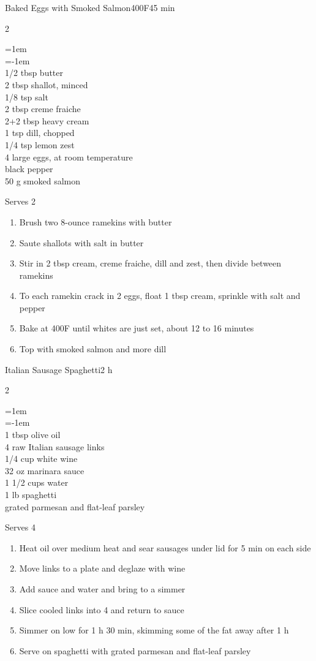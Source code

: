 \documentclass{article}
\newenvironment{recipe}[3][]
    {\begin{cardbase}[#1]{#2}{#3}
    \columnratio{0.333}
    \begin{paracol}{2}}
    {\end{paracol}\end{cardbase}}
\newenvironment{denserecipe}[3][]
    {\small
    \begin{recipe}[#1]{#2}{#3}}
    {\end{recipe}}
\newcommand{\nextcolumn}{\switchcolumn}
\newenvironment{ingredients}
    {
    \begin{obeylines}
    \vspace{\parskip}
    \setlength{\parskip}{0.25em}
    \vspace{-0.25em}
    \leftskip=1em
    \parindent=-1em}
    {\end{obeylines}}
\newenvironment{steps}
    {\begin{enumerate}[leftmargin=*,topsep=0pt]}
    {\end{enumerate}}
\newcommand{\fahrenheit}[1]{#1\textdegree{}F}
\newcommand{\tag}[1]{\hspace{1em}#1}
\newcommand{\symboltag}[2]{\tag{#1\hspace{0.4em}#2}}
\newcommand{\totaltime}[1]{\symboltag{\raisebox{-0.1em}{\small\StopWatchEnd}}{#1}}
\newcommand{\preheat}[1]{\symboltag{\Topbottomheat}{#1}}
\begin{document}
\begin{recipe}{Baked Eggs with Smoked Salmon}{\preheat{\fahrenheit{400}}\totaltime{45 min}}
\begin{ingredients}
1/2 tbsp butter
2 tbsp shallot, minced
1/8 tsp salt
2 tbsp creme fraiche
2+2 tbsp heavy cream
1 tsp dill, chopped
1/4 tsp lemon zest
4 large eggs, at room temperature
black pepper
50 g smoked salmon
\end{ingredients}
\nextcolumn
Serves 2
\begin{steps}
    \item Brush two 8-ounce ramekins with butter
    \item Saute shallots with salt in butter
    \item Stir in 2 tbsp cream, creme fraiche, dill and zest, then divide between ramekins
    \item To each ramekin crack in 2 eggs, float 1 tbsp cream, sprinkle with salt and pepper
    \item Bake at \fahrenheit{400} until whites are just set, about 12 to 16 minutes
    \item Top with smoked salmon and more dill
\end{steps}
\end{recipe}

\begin{denserecipe}{Italian Sausage Spaghetti}{\totaltime{2 h}}
\begin{ingredients}
1 tbsp olive oil
4 raw Italian sausage links
1/4 cup white wine
32 oz marinara sauce
1 1/2 cups water
1 lb spaghetti
grated parmesan and flat-leaf parsley
\end{ingredients}
\nextcolumn
Serves 4
\begin{steps}
    \item Heat oil over medium heat and sear sausages under lid for 5 min on each side
    \item Move links to a plate and deglaze with wine
    \item Add sauce and water and bring to a simmer
    \item Slice cooled links into 4 and return to sauce
    \item Simmer on low for 1 h 30 min, skimming some of the fat away after 1 h
    \item Serve on spaghetti with grated parmesan and flat-leaf parsley
\end{steps}
\end{denserecipe}

\fi
\end{document}
